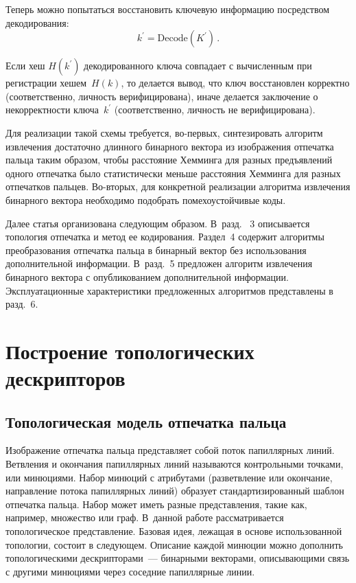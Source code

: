 \begin{multicols}{2}
      Теперь можно попытаться восстановить ключевую информацию посредством 
декодирования:
      \begin{equation*}
      k^\prime= \mathrm{Decode}\left( K^\prime\right)\,.
      \end{equation*}
      
      Если хеш $H(k^\prime)$ декодированного ключа совпадает с вычисленным при 
регистрации хешем~$H(k)$, то делается вывод, что ключ восстановлен корректно 
(соответственно, личность верифицирована), иначе делается заключение о 
некорректности ключа~$k^\prime$ (соответственно, личность не верифицирована). 
      
      Для реализации такой схемы требуется, во-пер\-вых, синтезировать алгоритм 
извлечения достаточно длинного бинарного вектора из изображения отпечатка пальца 
таким образом, чтобы расстояние Хемминга для разных предъявлений одного отпечатка 
было статистически меньше расстояния Хемминга для разных отпечатков пальцев. 
      Во-вто\-рых, для конкретной реализации алгоритма извлечения бинарного вектора 
необходимо подобрать помехоустойчивые коды.
     
      Далее статья организована следующим образом. В~разд.~ 3 описывается топология 
отпечатка и метод ее кодирования. Раздел~4 содержит алгоритмы преобразования 
отпечатка пальца в бинарный вектор без использования дополнительной информации. 
В~разд.~5 предложен алгоритм извлечения бинарного вектора с опубликованием 
дополнительной информации. Эксплуатационные характеристики предложенных 
алгоритмов представлены в разд.~6.

\section{Построение топологических дескрипторов}

\subsection{Топологическая модель отпечатка пальца}
      
      Изображение отпечатка пальца представляет собой поток папиллярных линий. 
Ветвления и окончания папиллярных линий называются контрольными точками, или 
минюциями. Набор \mbox{минюций} с атрибутами (разветвление или окончание, на\-прав\-ле\-ние 
потока папиллярных линий) образует стандартизированный шаблон отпечатка пальца. 
Набор может иметь разные представления, такие как,
 например, множество или граф. 
В~данной работе рассматривается топологическое представление. Базовая идея, лежащая 
в основе использованной топологии, состоит в следующем. Описание каж\-дой минюции 
можно дополнить топологическими дескрипторами~--- бинарными векторами, 
опи\-сы\-ва\-ющи\-ми связь с другими минюциями через соседние папиллярные линии. 
      


\end{multicols}
